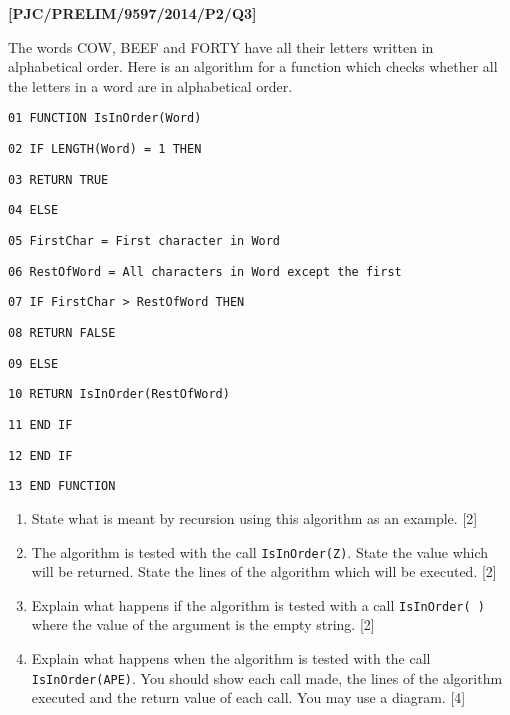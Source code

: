 \item \textbf{{[}PJC/PRELIM/9597/2014/P2/Q3{]} }

The words COW, BEEF and FORTY have all their letters written in alphabetical
order. Here is an algorithm for a function which checks whether all
the letters in a word are in alphabetical order. 

\noindent\begin{minipage}[t]{1\columnwidth}%
\texttt{01 FUNCTION IsInOrder(Word) }

\texttt{02 \qquad{}IF LENGTH(Word) = 1 THEN }

\texttt{03 \qquad{}\qquad{}RETURN TRUE }

\texttt{04 \qquad{}ELSE }

\texttt{05 \qquad{}\qquad{}FirstChar = First character in Word }

\texttt{06 \qquad{}\qquad{}RestOfWord = All characters in Word except
the first }

\texttt{07 \qquad{}\qquad{}IF FirstChar > RestOfWord THEN }

\texttt{08 \qquad{}\qquad{}\qquad{}RETURN FALSE }

\texttt{09 \qquad{}\qquad{}ELSE }

\texttt{10 \qquad{}\qquad{}\qquad{}RETURN IsInOrder(RestOfWord) }

\texttt{11 \qquad{}\qquad{}END IF }

\texttt{12 \qquad{}END IF }

\texttt{13 END FUNCTION} %
\end{minipage}
\begin{enumerate}
\item State what is meant by recursion using this algorithm as an example.
\hfill{}{[}2{]}
\item The algorithm is tested with the call \texttt{IsInOrder(\textquotedbl Z\textquotedbl )}.
State the value which will be returned. State the lines of the algorithm
which will be executed. \hfill{}{[}2{]}
\item Explain what happens if the algorithm is tested with a call \texttt{IsInOrder(\textquotedbl{}
\textquotedbl )} where the value of the argument is the empty string.
\hfill{}{[}2{]}
\item Explain what happens when the algorithm is tested with the call \texttt{IsInOrder(\textquotedbl APE\textquotedbl )}.
You should show each call made, the lines of the algorithm executed
and the return value of each call. You may use a diagram.\hfill{}
{[}4{]}
\end{enumerate}
